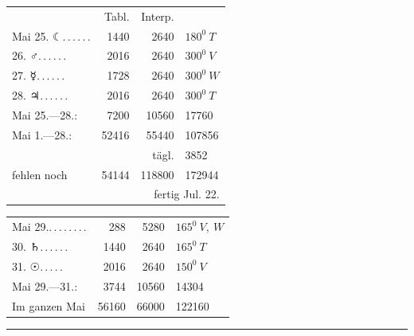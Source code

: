 \clearpage
\begingroup
{}
\renewcommand{\headrulewidth}{0pt}
\begingroup
\newcommand{\BJournalDay}[1]{{\upshape\AstroSymbols #1}}
\small\itshape
\begin{center}
\begin{tabular}{@{}p{.36\linewidth}rrl@{}}
&Tabl.&Interp.&\\
Mai 25. \BJournalDay{☾}\nobreak\hspace{.2em}\mbox{.\,.\,.\,.\,.\,.}\hfill&1440&2640&\(\mathit{180}^0\ T\)\\
\hfill 26. \BJournalDay{♂}\nobreak\hspace{.2em}\mbox{.\,.\,.\,.\,.\,.}\hfill&2016&2640&\(\mathit{300}^0\ V\)\\
\hfill 27. \BJournalDay{☿}\nobreak\hspace{.2em}\mbox{.\,.\,.\,.\,.\,.}\hfill&1728&2640&\(\mathit{300}^0\ W\)\\
\hfill 28. \BJournalDay{♃}\nobreak\hspace{.2em}\mbox{.\,.\,.\,.\,.\,.}\hfill&2016&2640&\(\mathit{300}^0\ T\)\\
\hfill Mai 25.—28.:&7200&10560&17760\\
\hfill Mai 1.—28.:&52416&55440&107856\\
&&tägl.&3852\\
\hfill fehlen noch&54144&118800&172944\\
\multicolumn{4}{r}{fertig Jul. 22.}\\
\hline
\end{tabular}
\end{center}
\begin{center}
\begin{tabular}{@{}p{.36\linewidth}rrl@{}}
Mai 29.\nobreak\hspace{.2em}\mbox{.\,.\,.\,.\,.\,.\,.\,.}\hfill&288&5280&\(\mathit{165}^0\ V,\ W\)\\
\hfill 30. \BJournalDay{♄}\nobreak\hspace{.2em}\mbox{.\,.\,.\,.\,.\,.}\hfill&1440&2640&\(\mathit{165}^0\ T\)\\
\hfill 31. \BJournalDay{☉}\nobreak\hspace{.2em}\mbox{.\,.\,.\,.\,.}\hfill&2016&2640&\(\mathit{150}^0\ V\)\\
\hfill Mai 29.—31.:&3744&10560&14304\\
Im ganzen Mai&56160&66000&122160
\end{tabular}\par\smallskip\rule{.25\linewidth}{.3pt}
\end{center}

